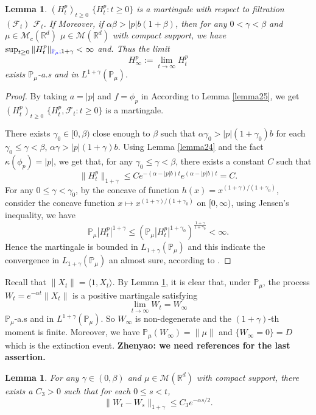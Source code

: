 \documentclass[12pt,oneside,english]{amsart}
\theoremstyle{plain}
\newtheorem{lem}[thm]{Lemma}
\theoremstyle{definition}
\numberwithin{equation}{section}
\newcommand{\added}[1]{{\color{blue}#1}}\newcommand{\deleted}[1]{{\color{red}#1}}
\begin{document}
\begin{lem}\label{lemma26}
    \added{$(H^p_t)_{t\geq 0}$} \deleted{$\{H_t^p: t\geq0\}$} is a martingale with respect to \added{filtration $(\mathscr F_t)$} \deleted{$\mathcal{F}_t$}. 
    \deleted{If} \added{Moreover, if} $\alpha\beta>|p|b(1+\beta)$, then for any $0< \gamma<\beta$ and \added{$\mu \in \mathcal M_c(\mathbb R^d)$} \deleted{$\mu \in \mathcal{M}(\mathbb{R}^d)$ with compact support}, we have $\sup_{t\geq 0}\|H_t^p\|_{\added{\mathbb P_\mu;}1+\gamma}< \infty$ \added{and}\deleted{. Thus the limit}
$$H_{\infty}^p:=\lim_{t\rightarrow \infty}H_t^p$$
exists $\mathbb{P}_{\mu}$-a.s and in $L^{1+\gamma}(\mathbb{P}_{\mu}).$
\end{lem}
\begin{proof}
    \deleted{By taking $a=|p|$ and $f=\phi_p$ in} \added{According to} Lemma \ref{lemma25}, we get \added{$(H_t^p)_{t\geq 0}$} \deleted{$\{H_t^p, \mathcal{F}_t:t\geq 0\}$} is a martingale.

    There exists $\gamma_0 \in [0,\beta)$ close enough to $\beta$ such that \deleted{$\alpha\gamma_0>|p|(1+\gamma_0)b$} \added{for each $\gamma_0 \leq \gamma < \beta$, $\alpha\gamma>|p|(1+\gamma)b$}. 
    Using  Lemma \ref{lemma24} and the fact $\kappa(\phi_p)=|p|$, we get that, for any $\gamma_0\leq\gamma<\beta$\added{, there exists a constant $C$ such that}
    $$\|H_t^p\|_{1+\gamma}\leq Ce^{-(\alpha-|p|b)t}e^{(\alpha-|p|b)t}=C.$$
    For any $0\leq\gamma<\gamma_0$, \deleted{by the concave of function $h(x)=x^{(1+\gamma)/(1+\gamma_0)}$,} \added{consider the concave function $x\mapsto x^{(1+\gamma)/(1+\gamma_0)}$ on $[0,\infty)$, using Jensen's inequality, we have}
    $$\mathbb{P}_{\mu}|H_t^p|^{1+\gamma}\leq(\mathbb{P}_{\mu}|H_t^p|^{1+\gamma_0})^{\frac{1+\gamma}{1+\gamma_0}}<\infty.$$
    Hence the martingale is bounded in $L_{1+\gamma}(\mathbb{P}_{\mu})$ and this indicate the convergence in $L_{1+\gamma}(\mathbb{P}_{\mu}) $ an almost sure,
    according to \cite[Theorem 5.4.5]{Durrett2010Probability}.
\end{proof}


    Recall that $\|X_t\|=\langle 1,X_t\rangle$.
    By Lemma \ref{lemma26},
    it is clear that,
    under $\mathbb{P}_{\mu}$, the process $W_t=e^{-\alpha t}\|X_t\|$ is a positive martingale satisfying
$$\lim_{t\rightarrow \infty} W_t= W_{\infty}$$
$\mathbb{P}_{\mu}$-a.s and in $L^{1+\gamma}(\mathbb{P}_{\mu})$. So $W_{\infty}$ is non-degenerate and the $(1+\gamma)$-th moment is finite. Moreover, we have $\mathbb{P}_{\mu}(W_{\infty})=\|\mu\|$ and $\{W_{\infty}=0\}=D$ which is the extinction event.
    {\bf Zhenyao: we need references for the last assertion.}
\begin{lem}\label{lemma27}
 For any $\gamma\in (0,\beta)$ and $\mu\in \mathcal M(\mathbb R^d)$ with compact support, there exists a $C_3> 0$ such that for each $0\leq s<t$,
 $$\|W_t-W_s\|_{1+\gamma}\leq C_3 e^{-\alpha s/2}.$$
\end{lem}
\end{document}
